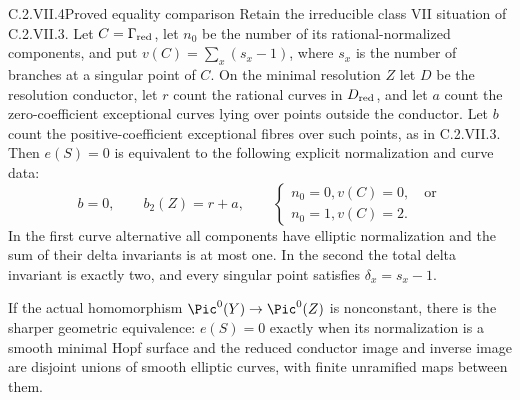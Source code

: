 \begin{idstatement}{C.2.VII.4}{Proved equality comparison}
\label{st:C.2.VII.4}
Retain the irreducible class VII situation of
C.2.VII.3. Let $C=\Gamma_{\rm red}$, let $n_0$
be the number of its rational-normalized components,
and put $v(C)=\sum_x(s_x-1)$, where $s_x$ is the
number of branches at a singular point of $C$.
On the minimal resolution $Z$ let $D$ be the
resolution conductor, let $r$ count the rational
curves in $D_{\rm red}$, and let $a$ count the
zero-coefficient exceptional curves lying over
points outside the conductor. Let $b$ count the
positive-coefficient exceptional fibres over
such points, as in C.2.VII.3. Then $e(S)=0$
is equivalent to the following explicit
normalization and curve data:
\[
 b=0,\qquad b_2(Z)=r+a,
 \qquad
 \begin{cases}
 n_0=0, v(C)=0,\quad\text{or}\\
 n_0=1, v(C)=2.
 \end{cases}
 \tag{C.VII.9}
\]
In the first curve alternative all components
have elliptic normalization and the sum of
their delta invariants is at most one. In the
second the total delta invariant is exactly
two, and every singular point satisfies
$\delta_x=s_x-1$.

If the actual homomorphism
$\Pic^0(Y)\to\Pic^0(Z)$ is nonconstant,
there is the sharper geometric equivalence:
$e(S)=0$ exactly when its normalization is a
smooth minimal Hopf surface and the reduced
conductor image and inverse image are disjoint
unions of smooth elliptic curves, with finite
unramified maps between them.
\end{idstatement}
